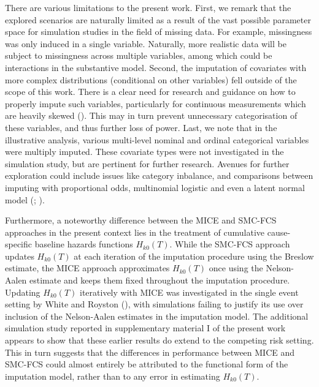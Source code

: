 \documentclass[
  letterpaper,
  paper=240mm:170mm,
  twoside=true,
  open=right,
  fontsize=10pt,
  pagesize=false,
  BCOR=15mm,
  DIV=14,
  headinclude=true,
  footinclude=false,
  headsepline=on]{scrbook}
\begin{document}
There are various limitations to the present work. First, we remark that
the explored scenarios are naturally limited as a result of the vast
possible parameter space for simulation studies in the field of missing
data. For example, missingness was only induced in a single variable.
Naturally, more realistic data will be subject to missingness across
multiple variables, among which could be interactions in the substantive
model. Second, the imputation of covariates with more complex
distributions (conditional on other variables) fell outside of the scope
of this work. There is a clear need for research and guidance on how to
properly impute such variables, particularly for continuous measurements
which are heavily skewed
(). This may in turn prevent unnecessary categorisation of these
variables, and thus further loss of power. Last, we note that in the
illustrative analysis, various multi-level nominal and ordinal
categorical variables were multiply imputed. These covariate types were
not investigated in the simulation study, but are pertinent for further
research. Avenues for further exploration could include issues like
category inbalance, and comparisons between imputing with proportional
odds, multinomial logistic and even a latent normal model
(; ).

Furthermore, a noteworthy difference between the MICE and SMC-FCS
approaches in the present context lies in the treatment of cumulative
cause-specific baseline hazards functions \(H_{k0}(T)\). While the
SMC-FCS approach updates \(H_{k0}(T)\) at each iteration of the
imputation procedure using the Breslow estimate, the MICE approach
approximates \(H_{k0}(T)\) once using the Nelson-Aalen estimate and
keeps them fixed throughout the imputation procedure. Updating
\(H_{k0}(T)\) iteratively with MICE was investigated in the single event
setting by White and Royston
(), with
simulations failing to justify its use over inclusion of the
Nelson-Aalen estimates in the imputation model. The additional
simulation study reported in supplementary material I of the present
work appears to show that these earlier results do extend to the
competing risk setting. This in turn suggests that the differences in
performance between MICE and SMC-FCS could almost entirely be attributed
to the functional form of the imputation model, rather than to any error
in estimating \(H_{k0}(T)\).
\end{document}
